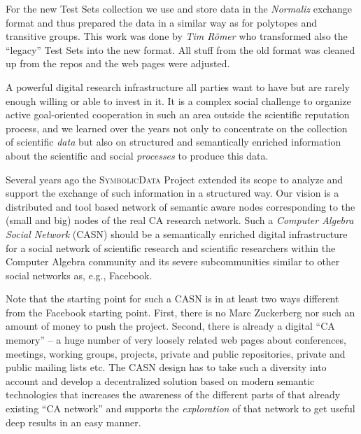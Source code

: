 \documentclass[a4paper,11pt]{article}
\def\SD{\textsc{Symbolic\-Data}}
\begin{document}
\begin{multicols}{2}
For the new Test Sets collection we use and store data in the \emph{Normaliz}
exchange format and thus prepared the data in a similar way as for polytopes
and transitive groups. This work was done by \emph{Tim R\"omer} who
transformed also the ``legacy'' Test Sets into the new format.  All stuff from
the old format was cleaned up from the repos and the web pages were adjusted.



A powerful digital research infrastructure all parties want to have but are
rarely enough willing or able to invest in it.  It is a complex social
challenge to organize active goal-oriented cooperation in such an area outside
the scientific reputation process, and we learned over the years not only to
concentrate on the collection of scientific \emph{data} but also on structured
and semantically enriched information about the scientific and social
\emph{processes} to produce this data.

Several years ago the {\SD} Project extended its scope to analyze and support
the exchange of such information in a structured way.  Our vision is a
distributed and tool based network of semantic aware nodes corresponding to
the (small and big) nodes of the real CA research network.  Such a
\emph{Computer Algebra Social Network} (CASN) should be a semantically
enriched digital infrastructure for a social network of scientific research
and scientific researchers within the Computer Algebra community and its
severe subcommunities similar to other social networks as, e.g., Facebook.

Note that the starting point for such a CASN is in at least two ways different
from the Facebook starting point. First, there is no Marc Zuckerberg nor such
an amount of money to push the project. Second, there is already a digital
``CA memory'' -- a huge number of very loosely related web pages about
conferences, meetings, working groups, projects, private and public
repositories, private and public mailing lists etc. The CASN design has to
take such a diversity into account and develop a decentralized solution based
on modern semantic technologies that increases the awareness of the different
parts of that already existing ``CA network'' and supports the
\emph{exploration} of that network to get useful deep results in an easy
manner.



\end{multicols}
\end{document}
